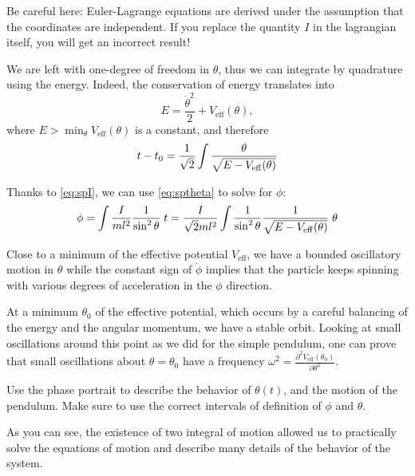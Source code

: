 \documentclass[english,fontsize=11pt,paper=a5,oneside]{scrbook}
\let\d\relax
\DeclareMathOperator{\d}{d}
\theoremstyle{definition}
\newenvironment{remark}
  {\pushQED{\qed}\renewcommand{\qedsymbol}{$\lozenge$}\remarkx}
  {\popQED\endremarkx}
\newenvironment{exercise}
  {\pushQED{\qed}\renewcommand{\qedsymbol}{$\maltese$}\exercisex}
  {\popQED\endexercisex}
\begin{document}
\begin{remark}
    Be careful here: Euler-Lagrange equations are derived under the assumption that the coordinates are independent. If you replace the quantity $I$ in the lagrangian itself, you will get an incorrect result!    
\end{remark}

We are left with one-degree of freedom in $\theta$, thus we can integrate by quadrature using the energy.
Indeed, the conservation of energy translates into
\begin{equation}
    E = \frac{\dot \theta^2}2 + V_{\mathrm{eff}}(\theta),
\end{equation}
where $E>\min_\theta V_{\mathrm{eff}}(\theta)$ is a constant, and therefore
\begin{equation}\label{eq:sptheta}
    t - t_0 = \frac1{\sqrt2}\int\frac{\d \theta}{\sqrt{E - V_{\mathrm{eff}}(\theta)}}
\end{equation}

Thanks to \eqref{eq:spI}, we can use \eqref{eq:sptheta} to solve for $\phi$:
\begin{equation}
    \phi = \int \frac{I}{ml^2} \frac1{\sin^2\theta} \;\d t
    = \frac{I}{\sqrt{2} m l^2}  \int \frac1{\sin^2\theta} \frac{1}{\sqrt{E - V_{\mathrm{eff}}(\theta)}}\; \d \theta
\end{equation}

Close to a minimum of the effective potential $V_{\mathrm{eff}}$, we have a bounded oscillatory motion in $\theta$ while the constant sign of $\dot\phi$ implies that the particle keeps spinning with various degrees of acceleration in the $\phi$ direction.

At a minimum $\theta_0$ of the effective potential, which occurs by a careful balancing of the energy and the angular momentum, we have a stable orbit.
Looking at small oscillations around this point as we did for the simple pendulum, one can prove that small oscillations about $\theta = \theta_0$ have a frequency $\omega^2 = \frac{\partial^2 V_{\mathrm{eff}}(\theta_0)}{\partial\theta^2}$.

\begin{exercise}
    Use the phase portrait to describe the behavior of $\theta(t)$, and the motion of the pendulum. Make sure to use the correct intervals of definition of $\phi$ and $\theta$.
\end{exercise}

As you can see, the existence of two integral of motion allowed us to practically solve the equations of motion and describe many details of the behavior of the system.
\end{document}

